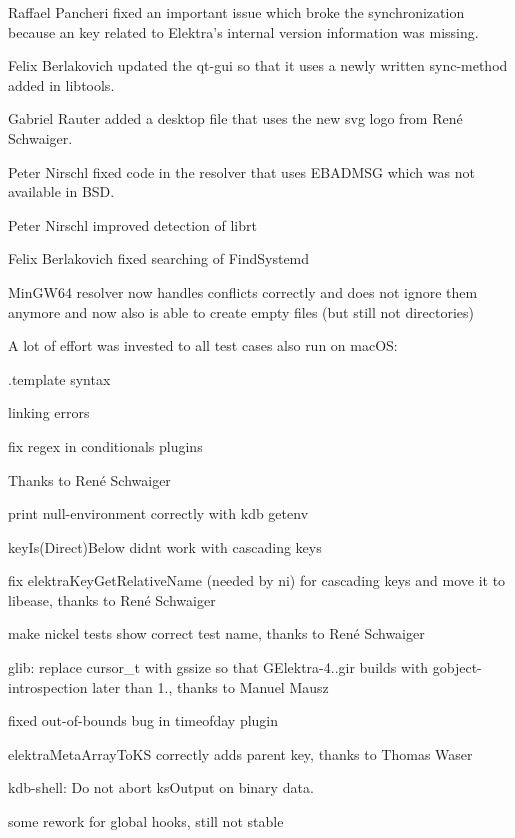 Raffael Pancheri fixed an important issue which broke the synchronization because an key related to Elektra’s internal version information was missing.

Felix Berlakovich updated the qt-\/gui so that it uses a newly written sync-\/method added in libtools.

Gabriel Rauter added a desktop file that uses the new svg logo from René Schwaiger.


\begin{DoxyItemize}
\item Peter Nirschl fixed code in the resolver that uses E\+B\+A\+D\+M\+SG which was not available in B\+SD.
\item Peter Nirschl improved detection of librt
\item Felix Berlakovich fixed searching of Find\+Systemd
\item Min\+G\+W64 resolver now handles conflicts correctly and does not ignore them anymore and now also is able to create empty files (but still not directories)
\end{DoxyItemize}

A lot of effort was invested to all test cases also run on mac\+OS\+:


\begin{DoxyItemize}
\item .template syntax
\item linking errors
\item fix regex in conditionals plugins
\end{DoxyItemize}

Thanks to René Schwaiger


\begin{DoxyItemize}
\item print null-\/environment correctly with {\ttfamily kdb getenv}
\item key\+Is(\+Direct)Below didn\textquotesingle{}t work with cascading keys
\item fix elektra\+Key\+Get\+Relative\+Name (needed by ni) for cascading keys and move it to libease, thanks to René Schwaiger
\item make nickel tests show correct test name, thanks to René Schwaiger
\item glib\+: replace cursor\+\_\+t with gssize so that G\+Elektra-\/4..\+gir builds with gobject-\/introspection later than 1., thanks to Manuel Mausz
\item fixed out-\/of-\/bounds bug in timeofday plugin
\item elektra\+Meta\+Array\+To\+KS correctly adds parent key, thanks to Thomas Waser
\item kdb-\/shell\+: Do not abort ks\+Output on binary data.
\item some rework for global hooks, still not stable
\end{DoxyItemize}


